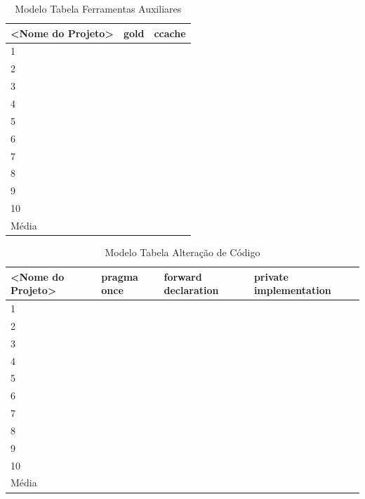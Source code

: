 \begin{table}[h]
\centering
\caption{Modelo Tabela Ferramentas Auxiliares}
\label{my-label}
\begin{tabular}{lll}
\hline
\textbf{<Nome do Projeto>} & \textbf{gold} & \textbf{ccache}   \\ \toprule
1                                    &     &        \\ \midrule
2                                    &     &        \\ \midrule
3                                    &     &        \\ \midrule
4                                    &     &        \\ \midrule
5                                    &     &        \\ \midrule
6                                    &     &        \\ \midrule
7                                    &     &        \\ \midrule
8                                    &     &        \\ \midrule
9                                    &     &        \\ \midrule
10                                   &     &        \\ \midrule
Média                                &     &        \\ \bottomrule
\end{tabular}
\end{table}

\begin{table}[]
\centering
\caption{Modelo Tabela Alteração de Código}
\label{my-label}
\begin{tabular}{llll}
\hline
\textbf{<Nome do Projeto>} & \textbf{pragma once} & \textbf{forward declaration} & \textbf{private implementation}   \\ \toprule
1                                    &     &     &        \\ \midrule
2                                    &     &     &        \\ \midrule
3                                    &     &     &        \\ \midrule
4                                    &     &     &        \\ \midrule
5                                    &     &     &        \\ \midrule
6                                    &     &     &        \\ \midrule
7                                    &     &     &        \\ \midrule
8                                    &     &     &        \\ \midrule
9                                    &     &     &        \\ \midrule
10                                   &     &     &        \\ \midrule
Média                                &     &     &        \\ \bottomrule
\end{tabular}
\end{table}
